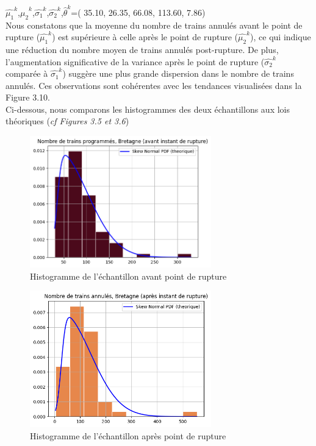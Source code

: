 {$\hat{\mu_1}^k$,$\hat{\mu_2}^k$,$\hat{\sigma_1}^k$,$\hat{\sigma_2}^k$,$\hat{\theta}^k$=( 35.10, 26.35, 66.08,  113.60, 7.86)\\

Nous constatons que la moyenne du nombre de trains annulés avant le point de rupture ($\hat{\mu_1}^k$) est supérieure à celle après le point de rupture ($\hat{\mu_2}^k$), ce qui indique une réduction du nombre moyen de trains annulés post-rupture. De plus, l'augmentation significative de la variance après le point de rupture ($\hat{\sigma_2}^k$ comparée à $\hat{\sigma_1}^k$) suggère une plus grande dispersion dans le nombre de trains annulés. Ces observations sont cohérentes avec les tendances visualisées dans la Figure 3.10.\\

Ci-dessous, nous comparons les histogrammes des deux échantillons aux lois théoriques (\textit{cf Figures 3.5 et 3.6})

\begin{figure}[H]
  \centering
  \includegraphics[width=0.7\textwidth]{image/BR-FIG11.png}
  \caption{Histogramme de l'échantillon avant point de rupture}
\end{figure}

\begin{figure}[H]
  \centering
  \includegraphics[width=0.7\textwidth]{image/BR-FIG12.png}
  \caption{Histogramme de l'échantillon après point de rupture}
\end{figure}


}
